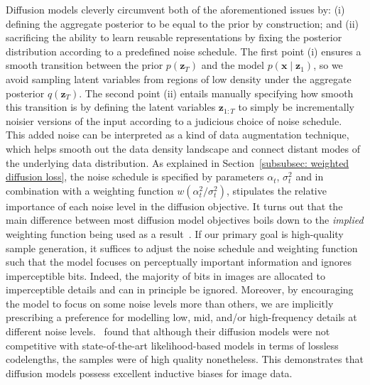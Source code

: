 Diffusion models cleverly circumvent both of the aforementioned issues by: (i) defining the aggregate posterior to be equal to the prior by construction; and (ii) sacrificing the ability to learn reusable representations by fixing the posterior distribution according to a predefined noise schedule. The first point (i) ensures a smooth transition between the prior $p(\mathbf{z}_T)$ and the model $p(\mathbf{x} \mid \mathbf{z}_1)$, so we avoid sampling latent variables from regions of low density under the aggregate posterior $q(\mathbf{z}_T)$. The second point (ii) entails manually specifying how smooth this transition is by defining the latent variables $\mathbf{z}_{1:T}$ to simply be incrementally noisier versions of the input according to a judicious choice of noise schedule. This added noise can be interpreted as a kind of data augmentation technique, which helps smooth out the data density landscape and connect distant modes of the underlying data distribution. As explained in Section~\ref{subsubsec: weighted diffusion loss}, the noise schedule is specified by parameters $\alpha_t$, $\sigma^2_t$ and in combination with a weighting function $w(\alpha^2_t/\sigma^2_t)$, stipulates the relative importance of each noise level in the diffusion objective. It turns out that the main difference between most diffusion model objectives boils down to the \textit{implied} weighting function being used as a result~\citep{kingma2021variational,kingma2023understanding}. If our primary goal is high-quality sample generation, it suffices to adjust the noise schedule and weighting function such that the model focuses on perceptually important information and ignores imperceptible bits. Indeed, the majority of bits in images are allocated to imperceptible details and can in principle be ignored. Moreover, by encouraging the model to focus on some noise levels more than others, we are implicitly prescribing a preference for modelling low, mid, and/or high-frequency details at different noise levels.~\cite{ho2020denoising} found that although their diffusion models were not competitive with state-of-the-art likelihood-based models in terms of lossless codelengths, the samples were of high quality nonetheless. This demonstrates that diffusion models possess excellent inductive biases for image data.

